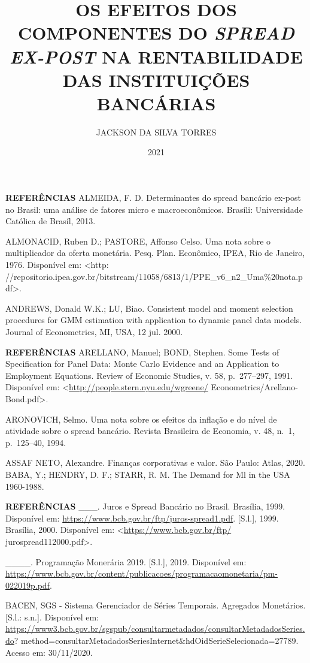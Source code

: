 \documentclass[
  ignorenonframetext,
  aspectratio=169,
  ignorenonframetext]{beamer}
\title{OS EFEITOS DOS COMPONENTES DO \emph{SPREAD} \emph{EX-POST} NA
RENTABILIDADE DAS INSTITUIÇÕES BANCÁRIAS}
\author{JACKSON DA SILVA TORRES}
\date{2021}
\begin{document}
\frame{\titlepage}

\begin{frame}{\textbf{REFERÊNCIAS}}
\protect\hypertarget{referuxeancias}{}
ALMEIDA, F. D. Determinantes do spread bancário ex-post no Brasil: uma
análise de fatores micro e macroeconômicos. Brasíli: Universidade
Católica de Brasíl, 2013.

ALMONACID, Ruben D.; PASTORE, Affonso Celso. Uma nota sobre o
multiplicador da oferta monetária. Pesq. Plan. Econômico, IPEA, Rio de
Janeiro, 1976. Disponível em: \textless http:
//repositorio.ipea.gov.br/bitstream/11058/6813/1/PPE\_v6\_n2\_Uma\%20nota.pdf\textgreater.

ANDREWS, Donald W.K.; LU, Biao. Consistent model and moment selection
procedures for GMM estimation with application to dynamic panel data
models. Journal of Econometrics, MI, USA, 12 jul. 2000.
\end{frame}

\begin{frame}{\textbf{REFERÊNCIAS}}
\protect\hypertarget{referuxeancias-1}{}
ARELLANO, Manuel; BOND, Stephen. Some Tests of Specification for Panel
Data: Monte Carlo Evidence and an Application to Employment Equations.
Review of Economic Studies, v. 58, p.~277--297, 1991. Disponível em:
\textless{}\url{http://people.stern.nyu.edu/wgreene/}
Econometrics/Arellano-Bond.pdf\textgreater.

ARONOVICH, Selmo. Uma nota sobre os efeitos da inflação e do nível de
atividade sobre o spread bancário. Revista Brasileira de Economia, v.
48, n.~1, p.~125--40, 1994.

ASSAF NETO, Alexandre. Finanças corporativas e valor. São Paulo: Atlas,
2020. BABA, Y.; HENDRY, D. F.; STARR, R. M. The Demand for Ml in the USA
1960-1988.
\end{frame}

\begin{frame}{\textbf{REFERÊNCIAS}}
\protect\hypertarget{referuxeancias-2}{}
\_\_\_. Juros e Spread Bancário no Brasil. Brasília, 1999. Disponível
em: \url{https://www.bcb.gov.br/ftp/juros-spread1.pdf}. {[}S.l.{]},
1999. Brasília, 2000. Disponível em:
\textless{}\url{https://www.bcb.gov.br/ftp/}
jurospread112000.pdf\textgreater.

\_\_\_\_. Programação Monerária 2019. {[}S.l.{]}, 2019. Disponível em:
\url{https://www.bcb.gov.br/content/publicacoes/programacaomonetaria/pm-022019p.pdf}.

BACEN, SGS - Sistema Gerenciador de Séries Temporais. Agregados
Monetários. {[}S.l.: s.n.{]}. Disponível em:
\url{https://www3.bcb.gov.br/sgspub/consultarmetadados/consultarMetadadosSeries.do}?
method=consultarMetadadosSeriesInternet\&hdOidSerieSelecionada=27789.
Acesso em: 30/11/2020.
\end{frame}
\end{document}
